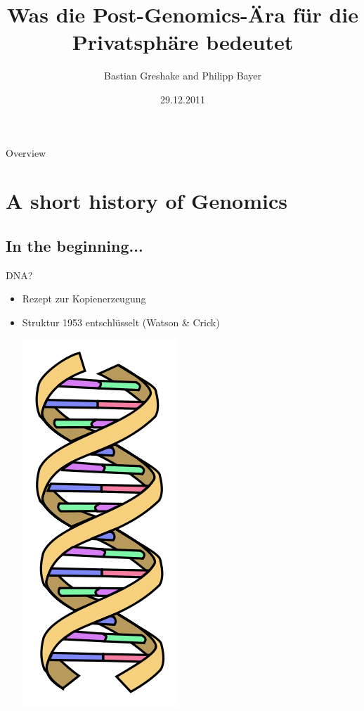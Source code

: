 \documentclass[12pt,a4paper]{beamer}
\title[Open-GWAS]{Was die Post-Genomics-\"Ara f\"ur die Privatsph\"are bedeutet}%
\date{29.12.2011}
\author{Bastian Greshake and Philipp Bayer}
\begin{document}
\begin{frame}
\titlepage
\end{frame}

\begin{frame}{Overview}
\tableofcontents
\end{frame}

\section{A short history of Genomics}
\subsection{In the beginning...}

\begin{frame}{DNA?}
	\begin{itemize}
		\item Rezept zur Kopienerzeugung
		\pause \item Struktur 1953 entschl\"usselt (Watson \& Crick)
		\begin{center}
			\includegraphics[scale=0.3]{220px-DNA_simple.png} \\
		\end{center}
	\end{itemize} 
\end{frame}
\end{document}
